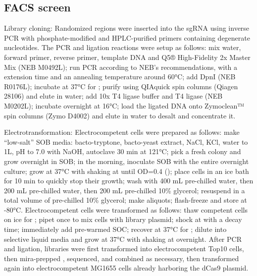 \documentclass[10pt,oneside]{article}
\begin{document}
\subsection{FACS screen}

Library cloning: Randomized regions were inserted into the sgRNA using inverse 
PCR with phosphate-modified and HPLC-purified primers containing degenerate 
nucleotides.  The PCR and ligation reactions were setup as follows: mix 
 water,   forward primer,   reverse 
primer,   template DNA and  Q5® High-Fidelity 2x 
Master Mix (NEB M0492L); run PCR according to NEB's recommendations, with a 
 extension time and an annealing temperature around 60°C; add  
 DpnI (NEB R0176L); incubate at 37°C for ; purify using QIAquick 
spin columns (Qiagen 28106) and elute in  water; add  10x T4 
ligase buffer and   T4 ligase (NEB M0202L); incubate overnight 
at 16°C; load the ligated DNA onto Zymoclean™ spin columns (Zymo D4002) and 
elute in  water to desalt and concentrate it.

Electrotransformation: Electrocompetent cells were prepared as follows: make 
``low-salt'' SOB media:  bacto-tryptone,  bacto-yeast extract, 
  NaCl,   KCl, water to 1L, pH to 7.0 with 
NaOH, autoclave 30 min at 121°C; pick a fresh colony and grow overnight in 
 SOB; in the morning, inoculate  SOB with the entire overnight 
culture; grow at 37°C with shaking at  until OD=0.4 (); place 
cells in an ice bath for 10 min to quickly stop their growth; wash with 400 mL 
pre-chilled water, then 200 mL pre-chilled water, then 200 mL pre-chilled 10\% 
glycerol; resuspend in a total volume of  pre-chilled 10\% glycerol; make 
 aliquots; flash-freeze and store at -80°C.  Electrocompetent cells 
were transformed as follows: thaw competent cells on ice for ; pipet 
once to mix cells with   library plasmid; shock at 
with a  decay time; immediately add  pre-warmed SOC; recover at 
37°C for ; dilute into selective liquid media and grow at 37°C with 
shaking at  overnight.  After PCR and ligation, libraries were first 
transformed into electrocompetent Top10 cells, then mira-prepped 
\autocite{pronobis2016}, sequenced, and combined as necessary, then transformed 
again into electrocompetent MG1655 cells already harboring the dCas9 plasmid.
\end{document}
